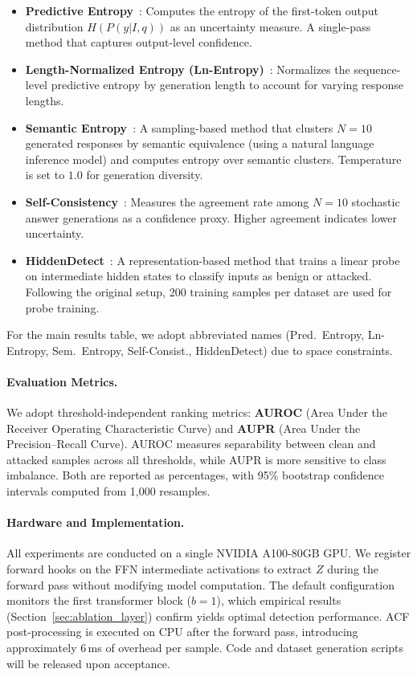 \documentclass[preprint,12pt]{elsarticle}
\begin{document}
\begin{itemize}[leftmargin=*]
    \item \textbf{Predictive Entropy}~\cite{kadavath2022language}: Computes the entropy of the first-token output distribution $H(P(y|I,q))$ as an uncertainty measure. A single-pass method that captures output-level confidence.
    \item \textbf{Length-Normalized Entropy (Ln-Entropy)}~\cite{malinin2020uncertainty}: Normalizes the sequence-level predictive entropy by generation length to account for varying response lengths.
    \item \textbf{Semantic Entropy}~\cite{farquhar2024detecting}: A sampling-based method that clusters $N=10$ generated responses by semantic equivalence (using a natural language inference model) and computes entropy over semantic clusters. Temperature is set to $1.0$ for generation diversity.
    \item \textbf{Self-Consistency}~\cite{wang2022self}: Measures the agreement rate among $N=10$ stochastic answer generations as a confidence proxy. Higher agreement indicates lower uncertainty.
    \item \textbf{HiddenDetect}~\cite{jiang2025hiddendetect}: A representation-based method that trains a linear probe on intermediate hidden states to classify inputs as benign or attacked. Following the original setup, 200 training samples per dataset are used for probe training.
\end{itemize}

For the main results table, we adopt abbreviated names (Pred.\ Entropy, Ln-Entropy, Sem.\ Entropy, Self-Consist., HiddenDetect) due to space constraints.

\paragraph{Evaluation Metrics.}
We adopt threshold-independent ranking metrics: \textbf{AUROC} (Area Under the Receiver Operating Characteristic Curve) and \textbf{AUPR} (Area Under the Precision--Recall Curve). AUROC measures separability between clean and attacked samples across all thresholds, while AUPR is more sensitive to class imbalance. Both are reported as percentages, with 95\% bootstrap confidence intervals computed from 1,000 resamples.

\paragraph{Hardware and Implementation.}
All experiments are conducted on a single NVIDIA A100-80GB GPU. We register forward hooks on the FFN intermediate activations to extract $Z$ during the forward pass without modifying model computation. The default configuration monitors the first transformer block ($b=1$), which empirical results (Section~\ref{sec:ablation_layer}) confirm yields optimal detection performance. ACF post-processing is executed on CPU after the forward pass, introducing approximately 6\,ms of overhead per sample. Code and dataset generation scripts will be released upon acceptance.
\end{document}
